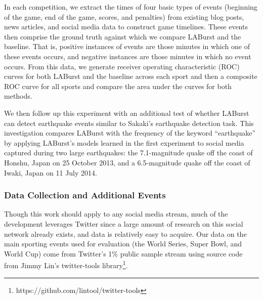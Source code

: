 \documentclass{acm_proc_article-sp}
\begin{document}
In each competition, we extract the times of four basic types of events (beginning of the game, end of the game, scores, and penalties) from existing blog posts, news articles, and social media data to construct game timelines.
These events then comprise the ground truth against which we compare LABurst and the baseline.
That is, positive instances of events are those minutes in which one of these events occurs, and negative instances are those minutes in which no event occurs.
From this data, we generate receiver operating characteristic (ROC) curves for both LABurst and the baseline across each sport and then a composite ROC curve for all sports and compare the area under the curves for both methods.

We then follow up this experiment with an additional test of whether LABurst can detect earthquake events similar to Sakaki's earthquake detection task.
This investigation compares LABurst with the frequency of the keyword ``earthquake'' by applying LABurst's models learned in the first experiment to social media captured during two large earthquakes: the 7.1-magnitude quake off the coast of Honshu, Japan on 25 October 2013, and a 6.5-magnitude quake off the coast of Iwaki, Japan on 11 July 2014.

\subsubsection{Data Collection and Additional Events}

Though this work should apply to any social media stream, much of the development leverages Twitter since a large amount of research on this social network already exists, and data is relatively easy to acquire.
Our data on the main sporting events used for evaluation (the World Series, Super Bowl, and World Cup) come from Twitter's 1\% public sample stream using source code from Jimmy Lin's twitter-tools library\footnote{https://github.com/lintool/twitter-tools}.
\end{document}
